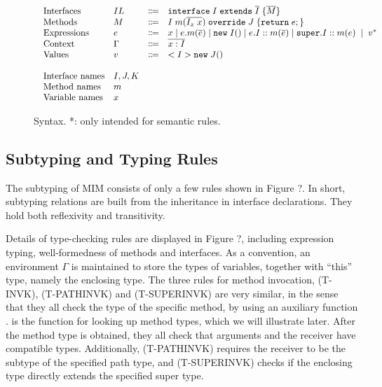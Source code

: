 \begin{figure*}[htbp]
\begin{displaymath}
\begin{array}{l}
\begin{array}{llrl}
\text{Interfaces}   & IL & \Coloneqq & \texttt{interface} \; I \; \texttt{extends} \; \overline{I} \; {\{} \overline{M} {\}} \\
\text{Methods}      & M  & \Coloneqq & I \; m (\overline{I_x \; x}) \; \texttt{override} \; J \; {\{} \texttt{return} \; e ; {\}} \\
\text{Expressions}  & e  & \Coloneqq & x \mid
e.m(\overline{e}) \mid
\texttt{new} \; I() \mid
e.I::m(\overline{e}) \mid
\texttt{super}.I::m(e) \; \mid \; v^* \\
\text{Context}      & \Gamma & \Coloneqq & \overline{x:I} \\
\text{Values}       & v & \Coloneqq & <I>\texttt{new} \; J() \\
\\
\text{Interface names} & I, J, K & & \\
\text{Method names} & m & & \\
\text{Variable names} & x & &
\end{array}
\end{array}
\end{displaymath}
\caption{Syntax. *: only intended for semantic rules. }\label{fig:syntax}
\end{figure*}

\subsection{Subtyping and Typing Rules}
The subtyping of MIM consists of only a few rules shown in Figure ?.
In short, subtyping relations are built from the inheritance in interface
declarations. They hold both reflexivity and transitivity.

Details of type-checking rules are displayed in Figure ?, including expression
typing, well-formedness of methods and interfaces. As a convention, an environment
$\Gamma$ is maintained to store the types of variables, together with ``this'' type, namely
the enclosing type. The three rules for method invocation, (T-INVK), (T-PATHINVK) and (T-SUPERINVK)
are very similar, in the sense that they all check the type of the specific method, by using
an auxiliary function \mtype. \mtype is the function for looking up method types, which we will
illustrate later. After the method type is obtained, they all check that arguments and the receiver
have compatible types. Additionally, (T-PATHINVK) requires the receiver to be the subtype of the specified
path type, and (T-SUPERINVK) checks if the enclosing type directly extends the specified super type.

